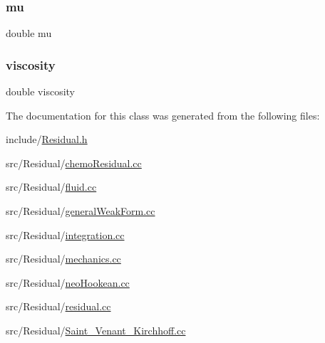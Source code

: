 \mbox{\label{class_residual_a74577585cf12d1712ab9c57616d49205}} 
\subsubsection{\texorpdfstring{mu}{mu}}
{\footnotesize\ttfamily double mu}

\mbox{\label{class_residual_ad80875e5d1c4362e2eae93663ad723fb}} 
\subsubsection{\texorpdfstring{viscosity}{viscosity}}
{\footnotesize\ttfamily double viscosity}



The documentation for this class was generated from the following files\+:\begin{DoxyCompactItemize}
\item 
include/\mbox{\hyperlink{_residual_8h}{Residual.\+h}}\item 
src/\+Residual/\mbox{\hyperlink{chemo_residual_8cc}{chemo\+Residual.\+cc}}\item 
src/\+Residual/\mbox{\hyperlink{fluid_8cc}{fluid.\+cc}}\item 
src/\+Residual/\mbox{\hyperlink{general_weak_form_8cc}{general\+Weak\+Form.\+cc}}\item 
src/\+Residual/\mbox{\hyperlink{integration_8cc}{integration.\+cc}}\item 
src/\+Residual/\mbox{\hyperlink{mechanics_8cc}{mechanics.\+cc}}\item 
src/\+Residual/\mbox{\hyperlink{neo_hookean_8cc}{neo\+Hookean.\+cc}}\item 
src/\+Residual/\mbox{\hyperlink{residual_8cc}{residual.\+cc}}\item 
src/\+Residual/\mbox{\hyperlink{_saint___venant___kirchhoff_8cc}{Saint\+\_\+\+Venant\+\_\+\+Kirchhoff.\+cc}}\end{DoxyCompactItemize}
